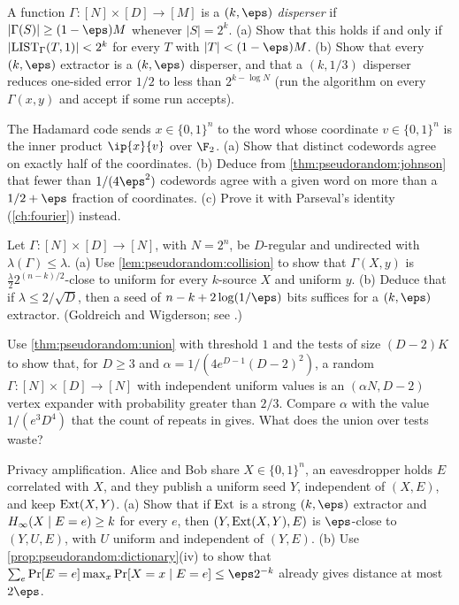 \begin{refsection}
\begin{exercises}
\item \consolidation\label{ex:pseudorandom:disperser} A function $\Gamma\colon[N]\times[D]\to[M]$ is a \emph{$(k,\eps)$ disperser} if $|\Gamma(S)|\ge(1-\eps)M$ whenever $|S|=2^k$. (a) Show that this holds if and only if $|\mathrm{LIST}_\Gamma(T,1)|<2^k$ for every $T$ with $|T|<(1-\eps)M$. (b) Show that every $(k,\eps)$ extractor is a $(k,\eps)$ disperser, and that a $(k,1/3)$ disperser reduces one-sided error $1/2$ to less than $2^{k-\log N}$ (run the algorithm on every $\Gamma(x,y)$ and accept if some run accepts).

\item \consolidation\label{ex:pseudorandom:hadamard} The Hadamard code sends $x\in\{0,1\}^n$ to the word whose coordinate $v\in\{0,1\}^n$ is the inner product $\ip{x}{v}$ over $\F_2$. (a) Show that distinct codewords agree on exactly half of the coordinates. (b) Deduce from \cref{thm:pseudorandom:johnson} that fewer than $1/(4\eps^2)$ codewords agree with a given word on more than a $1/2+\eps$ fraction of coordinates. (c) Prove it with Parseval's identity (\cref{ch:fourier}) instead.

\item \consolidation\label{ex:pseudorandom:spectral} Let $\Gamma\colon[N]\times[D]\to[N]$, with $N=2^n$, be $D$-regular and undirected with $\lambda(\Gamma)\le\lambda$. (a) Use \cref{lem:pseudorandom:collision} to show that $\Gamma(X,y)$ is $\frac\lambda22^{(n-k)/2}$-close to uniform for every $k$-source $X$ and uniform $y$. (b) Deduce that if $\lambda\le2/\sqrt D$, then a seed of $n-k+2\log(1/\eps)$ bits suffices for a $(k,\eps)$ extractor. (Goldreich and Wigderson; see \textcite[\S6.2]{Vadhan2012}.)

\item \consolidation\label{ex:pseudorandom:randomexp} Use \cref{thm:pseudorandom:union} with threshold $1$ and the tests of size $(D-2)K$ to show that, for $D\ge3$ and $\alpha=1/(4e^{D-1}(D-2)^2)$, a random $\Gamma\colon[N]\times[D]\to[N]$ with independent uniform values is an $(\alpha N,D-2)$ vertex expander with probability greater than $2/3$. Compare $\alpha$ with the value $1/(e^3D^4)$ that the count of repeats in \textcite[Theorem~4.4]{Vadhan2012} gives. What does the union over tests waste?

\item \transfer\label{ex:pseudorandom:privacy} Privacy amplification. Alice and Bob share $X\in\{0,1\}^n$, an eavesdropper holds $E$ correlated with $X$, and they publish a uniform seed $Y$, independent of $(X,E)$, and keep $\operatorname{Ext}(X,Y)$. (a) Show that if $\operatorname{Ext}$ is a strong $(k,\eps)$ extractor and $H_{\infty}(X\mid E=e)\ge k$ for every $e$, then $(Y,\operatorname{Ext}(X,Y),E)$ is $\eps$-close to $(Y,U,E)$, with $U$ uniform and independent of $(Y,E)$. (b) Use \cref{prop:pseudorandom:dictionary}(iv) to show that $\sum_e\Pr[E=e]\max_x\Pr[X=x\mid E=e]\le\eps2^{-k}$ already gives distance at most $2\eps$.


\end{exercises}
\end{refsection}

